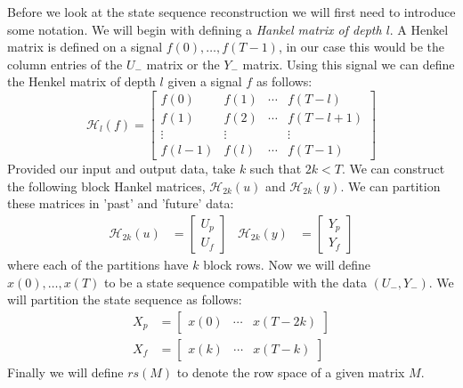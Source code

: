 Before we look at the state sequence reconstruction we will first need to introduce some notation. We will begin with defining a \textit{Hankel matrix of depth $l$}. A Henkel matrix is defined on a signal $f(0), \dots, f(T-1)$, in our case this would be the column entries of the $U_-$ matrix or the $Y_-$ matrix. Using this signal we can define the Henkel matrix of depth $l$ given a signal $f$ as follows:
\begin{equation*}
	\mathcal{H}_l (f) = 
	\begin{bmatrix} 
		f(0) & f(1) & \cdots & f(T-l) \\ 
		f(1) & f(2) & \cdots & f(T-l+1) \\ 
		\vdots & \vdots & & \vdots \\ 
		f(l-1) & f(l) & \cdots & f(T-1)
	\end{bmatrix}
\end{equation*}
Provided our input and output data, take $k$ such that $2k < T$. We can construct the following block Hankel matrices, $\mathcal{H}_{2k}(u)$ and $\mathcal{H}_{2k}(y)$. We can partition these matrices in 'past' and 'future' data:
\begin{align*}
	\mathcal{H}_{2k}(u) &= \begin{bmatrix} U_p \\ U_f \end{bmatrix} & 
	\mathcal{H}_{2k}(y) &= \begin{bmatrix} Y_p \\ Y_f \end{bmatrix}
\end{align*}
where each of the partitions have $k$ block rows. Now we will define $x(0), \dots, x(T)$ to be a state sequence compatible with the data $(U_-,Y_-)$. We will partition the state sequence as follows:
\begin{align*}
	X_p &= \begin{bmatrix} x(0) & \cdots & x(T-2k) \end{bmatrix} \\
	X_f &= \begin{bmatrix} x(k) & \cdots & x(T-k) \end{bmatrix} 
\end{align*}
Finally we will define $rs(M)$ to denote the row space of a given matrix $M$. 

